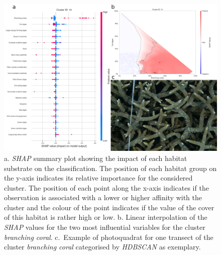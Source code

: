 \begin{figure}
\hypertarget{fig:chap2figS34}{%
\centering
\includegraphics{03-Chapitre2/figures/supplementary/05-explanation_shap_pq_cluster_14.png}
\caption{a. \emph{SHAP} summary plot showing the impact of each habitat
substrate on the classification. The position of each habitat group on
the y-axis indicates its relative importance for the considered cluster.
The position of each point along the x-axis indicates if the observation
is associated with a lower or higher affinity with the cluster and the
colour of the point indicates if the value of the cover of this habitat
is rather high or low. b. Linear interpolation of the \emph{SHAP} values
for the two most influential variables for the cluster \emph{branching
coral}. c.~Example of photoquadrat for one transect of the cluster
\emph{branching coral} categorised by \emph{HDBSCAN} as
exemplary.}\label{fig:chap2figS34}
}
\end{figure}

